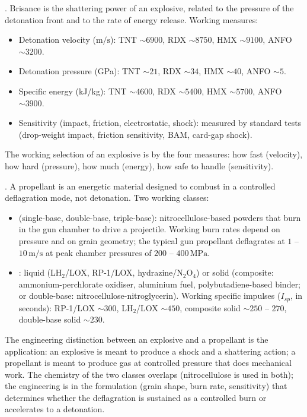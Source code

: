 .
Brisance is the shattering power of an explosive, related to the
pressure of the detonation front and to the rate of energy release.
Working measures:

\begin{itemize}[leftmargin=*]
\item Detonation velocity ($\text{m}/\text{s}$): TNT $\sim 6900$,
  RDX $\sim 8750$, HMX $\sim 9100$, ANFO $\sim 3200$.
\item Detonation pressure (GPa): TNT $\sim 21$, RDX $\sim 34$, HMX
  $\sim 40$, ANFO $\sim 5$.
\item Specific energy (kJ/kg): TNT $\sim 4600$, RDX $\sim 5400$, HMX
  $\sim 5700$, ANFO $\sim 3900$.
\item Sensitivity (impact, friction, electrostatic, shock): measured
  by standard tests (drop-weight impact, friction sensitivity, BAM,
  card-gap shock).
\end{itemize}

The working selection of an explosive is by the four measures: how
fast (velocity), how hard (pressure), how much (energy), how
safe to handle (sensitivity).

. A propellant is an energetic material designed
to combust in a controlled deflagration mode, not detonation. Two
working classes:

\begin{itemize}[leftmargin=*]
\item {} (single-base, double-base,
  triple-base): nitrocellulose-based powders that burn in the gun
  chamber to drive a projectile. Working burn rates depend on
  pressure and on grain geometry; the typical gun propellant
  deflagrates at $1$ -- $10\,\text{m}/\text{s}$ at peak chamber
  pressures of $200$ -- $400\,\text{MPa}$.
\item {}: liquid (LH$_2$/LOX, RP-1/LOX,
  hydrazine/N$_2$O$_4$) or solid (composite: ammonium-perchlorate
  oxidiser, aluminium fuel, polybutadiene-based binder; or
  double-base: nitrocellulose-nitroglycerin). Working specific
  impulses ($I_{sp}$, in seconds): RP-1/LOX $\sim 300$, LH$_2$/LOX
  $\sim 450$, composite solid $\sim 250$ -- $270$, double-base solid
  $\sim 230$.
\end{itemize}

The engineering distinction between an explosive and a propellant is
the application: an explosive is meant to produce a shock and a
shattering action; a propellant is meant to produce gas at controlled
pressure that does mechanical work. The chemistry of the two classes
overlaps (nitrocellulose is used in both); the engineering is in the
formulation (grain shape, burn rate, sensitivity) that determines
whether the deflagration is sustained as a controlled burn or
accelerates to a detonation.

